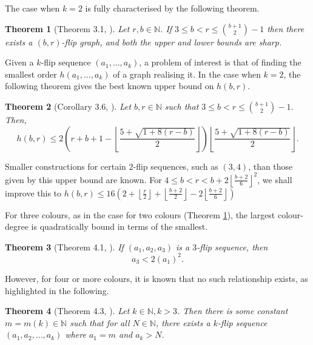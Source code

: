 \documentclass[a4paper,12pt]{article}
\newtheorem{theorem}{Theorem}[section]
\begin{document}
The case when $k = 2$ is fully characterised by the following theorem.

\begin{theorem}[Theorem 3.1, \cite{caro2023flip}]\label{RBClassification}
	Let $r, b \in \mathbb{N}$. If $3 \leq b < r \leq \binom{b+1}{2} - 1$ then there exists a $(b,r)$-flip graph, and both the upper and lower bounds are sharp.
\end{theorem}

Given a $k$-flip sequence $(a_1, \dots, a_k)$, a problem of interest is that of finding the smallest order $h(a_1, \dots, a_k)$ of a graph realising it. In the case when $k = 2$, the following theorem gives the best known upper bound on $h(b,r)$. 

\begin{theorem}[Corollary 3.6, \cite{caro2023flip}]\label{oldBound}
	Let $b, r \in \mathbb{N}$ such that $3 \leq b < r \le \binom{b+1}{2}-1$. Then,
$$ h(b,r) \leq 2 \left(r + b + 1 - \left\lfloor \dfrac{5 + \sqrt{1+8(r-b)}}{2} \right\rfloor\right) \left\lfloor \dfrac{5 + \sqrt{1+8(r-b)}}{2} \right\rfloor.
$$	
\end{theorem}

Smaller constructions for certain 2-flip sequences, such as $(3, 4)$, than those given by this upper bound are known. For $4 \leq b < r < b + 2 \left\lfloor\frac{b+2}{6}\right\rfloor^2$, we shall improve this to $h(b,r) \leq 16 \left(2 + \left\lfloor\frac{r}{2}\right\rfloor + \left\lfloor\frac{b+2}{2}\right\rfloor - 2\left\lfloor\frac{b+2}{6}\right\rfloor\right)$ 

For three colours, as in the case for two colours (Theorem \ref{RBClassification}), the largest colour-degree is quadratically bound in terms of the smallest.

\begin{theorem}[Theorem 4.1, \cite{caro2023flip}]\label{3colour_bound}
If $(a_1, a_2, a_3)$ is a $3$-flip sequence, then
$$a_3 < 2(a_1)^2.$$
\end{theorem}

However, for four or more colours, it is known that no such relationship exists, as highlighted in the following.

\begin{theorem}[Theorem 4.3, \cite{caro2023flip}] \label{arbitraryGapsThm_h_1}
	Let $k \in \mathbb{N}, k > 3$. Then there is some constant $m = m(k) \in \mathbb{N}$ such that for all $N \in \mathbb{N}$, there exists a $k$-flip sequence $\left(a_1, a_2, \dots, a_k\right)$ where $a_1 = m$ and $a_k > N$. 
\end{theorem}
\end{document}
